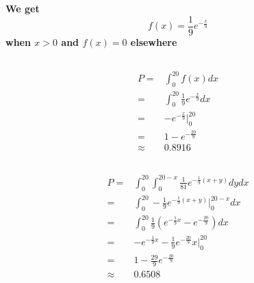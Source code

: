 \documentclass{article}
\begin{document}
    \section{}
        \paragraph{
            We get$$f(x)=\frac{1}{9}e^{-\frac{x}{9}}$$
            when $x>0$ and $f(x)=0$ elsewhere
        }
        \subsection{}
            \paragraph{
                \begin{equation*}
                    \begin{split}
                        P=&\int _0 ^{20} f(x)dx\\
                            =&\int _0 ^{20} \frac{1}{9}e^{-\frac{x}{9}}dx\\
                            =&-e^{-\frac{x}{9}}|_0^{20}\\
                            =&1-e^{-\frac{20}{9}}\\
                            \approx&0.8916
                    \end{split}
                \end{equation*}
            }
        \subsection{}
            \paragraph{
                \begin{equation*}
                    \begin{split}
                        P=&\int_0^{20}\int_{0}^{20-x}\frac{1}{81}e^{-\frac{1}{9}(x+y)}dydx\\
                            =&\int_0^{20}-\frac{1}{9}e^{-\frac{1}{9}(x+y)}|_0^{20-x}dx\\
                            =&\int_0^{20}\frac{1}{9}(e^{-\frac{1}{9}x}-e^{-\frac{20}{9}})dx\\
                            =&-e^{-\frac{1}{9}x}-\frac{1}{9}e^{-\frac{20}{9}}x|_0^{20}\\
                            =&1-\frac{29}{9}e^{-\frac{20}{9}}\\
                            \approx&0.6508
                    \end{split}
                \end{equation*}
            }
                
\end{document}
